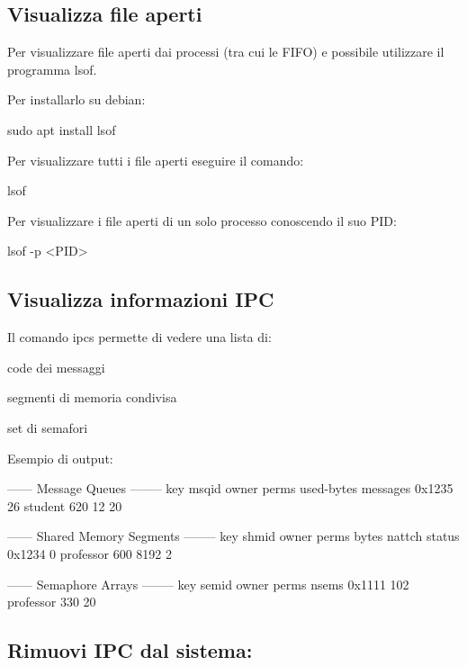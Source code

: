 \subsection*{Visualizza file aperti}

Per visualizzare file aperti dai processi (tra cui le F\+I\+FO) e\textquotesingle{} possibile utilizzare il programma {\ttfamily lsof}.

Per installarlo su debian\+: 
\begin{DoxyCode}
sudo apt install lsof
\end{DoxyCode}


Per visualizzare tutti i file aperti eseguire il comando\+: 
\begin{DoxyCode}
lsof
\end{DoxyCode}


Per visualizzare i file aperti di un solo processo conoscendo il suo P\+ID\+: 
\begin{DoxyCode}
lsof -p <PID>
\end{DoxyCode}


\subsection*{Visualizza informazioni I\+PC}

Il comando {\ttfamily ipcs} permette di vedere una lista di\+:
\begin{DoxyItemize}
\item code dei messaggi
\item segmenti di memoria condivisa
\item set di semafori
\end{DoxyItemize}

Esempio di output\+: 
\begin{DoxyCode}
------ Message Queues --------
key     msqid  owner    perms  used-bytes  messages
0x1235  26     student  620    12          20

------ Shared Memory Segments --------
key     shmid  owner      perms  bytes  nattch  status
0x1234  0      professor  600    8192   2

------ Semaphore Arrays --------
key     semid  owner      perms  nsems
0x1111  102    professor  330    20
\end{DoxyCode}


\subsection*{Rimuovi I\+PC dal sistema\+:}

